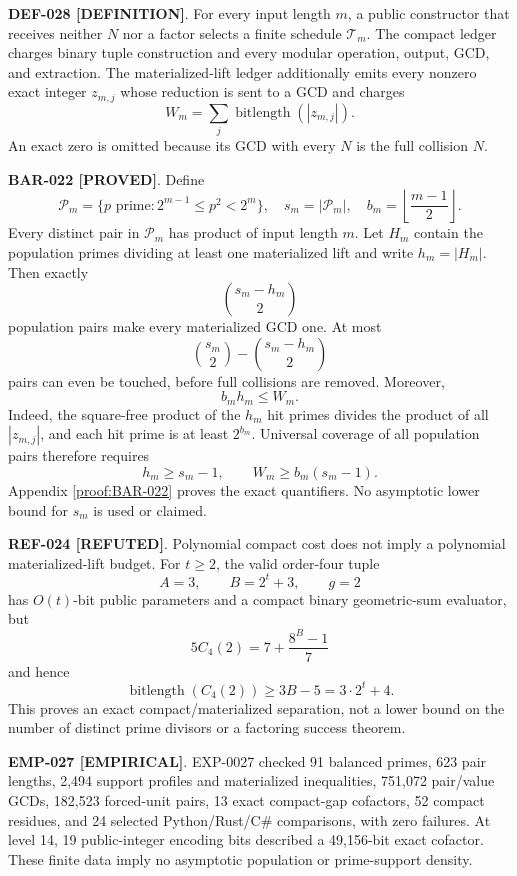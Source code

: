 \documentclass[11pt]{article}
\newcommand{\claimstatus}[2]{\textbf{#1 [#2]}}
\begin{document}
\claimstatus{DEF-028}{DEFINITION}. For every input length \(m\), a public
constructor that receives neither \(N\) nor a factor selects a finite schedule
\(\mathcal T_m\). The compact ledger charges binary tuple construction and
every modular operation, output, GCD, and extraction. The materialized-lift
ledger additionally emits every nonzero exact integer \(z_{m,j}\) whose
reduction is sent to a GCD and charges
\[
 W_m=\sum_j\operatorname{bitlength}(|z_{m,j}|).
\]
An exact zero is omitted because its GCD with every \(N\) is the full
collision \(N\).

\claimstatus{BAR-022}{PROVED}. Define
\[
 \mathcal P_m=\{p\text{ prime}:2^{m-1}\le p^2<2^m\},\quad
 s_m=|\mathcal P_m|,\quad
 b_m=\left\lfloor\frac{m-1}{2}\right\rfloor.
\]
Every distinct pair in \(\mathcal P_m\) has product of input length \(m\).
Let \(H_m\) contain the population primes dividing at least one materialized
lift and write \(h_m=|H_m|\). Then exactly
\[
 \binom{s_m-h_m}{2}
\]
population pairs make every materialized GCD one. At most
\[
 \binom{s_m}{2}-\binom{s_m-h_m}{2}
\]
pairs can even be touched, before full collisions are removed. Moreover,
\[
 b_mh_m\le W_m.
\]
Indeed, the square-free product of the \(h_m\) hit primes divides the product
of all \(|z_{m,j}|\), and each hit prime is at least \(2^{b_m}\). Universal
coverage of all population pairs therefore requires
\[
 h_m\ge s_m-1,\qquad W_m\ge b_m(s_m-1).
\]
Appendix \ref{proof:BAR-022} proves the exact quantifiers. No asymptotic lower
bound for \(s_m\) is used or claimed.

\claimstatus{REF-024}{REFUTED}. Polynomial compact cost does not imply a
polynomial materialized-lift budget. For \(t\ge2\), the valid order-four tuple
\[
 A=3,\qquad B=2^t+3,\qquad g=2
\]
has \(O(t)\)-bit public parameters and a compact binary geometric-sum
evaluator, but
\[
 5C_4(2)=7+\frac{8^B-1}{7}
\]
and hence
\[
 \operatorname{bitlength}(C_4(2))
 \ge3B-5=3\cdot2^t+4.
\]
This proves an exact compact/materialized separation, not a lower bound on
the number of distinct prime divisors or a factoring success theorem.

\claimstatus{EMP-027}{EMPIRICAL}. EXP-0027 checked 91 balanced primes, 623
pair lengths, 2,494 support profiles and materialized inequalities, 751,072
pair/value GCDs, 182,523 forced-unit pairs, 13 exact compact-gap cofactors,
52 compact residues, and 24 selected Python/Rust/C\# comparisons, with zero
failures. At level 14, 19 public-integer encoding bits described a
49,156-bit exact cofactor. These finite data imply no asymptotic population
or prime-support density.
\end{document}
